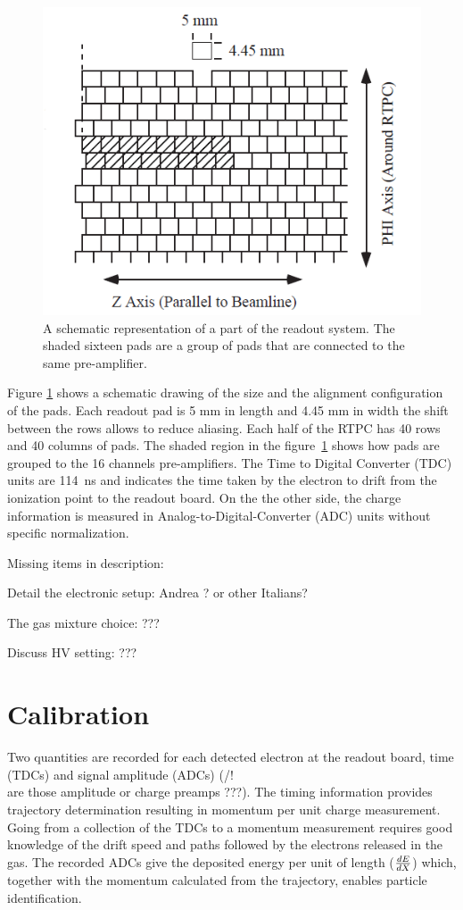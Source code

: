 \documentclass[twocolumn,showpacs,superscriptaddress,groupedaddress]{revtex4}
\begin{document}
\begin{figure}[tb]
   \centering
   \includegraphics[scale=0.55]{fig/PADs.png}
   \caption[]{A schematic representation of a part of the readout system.  The 
   shaded sixteen pads are a group of pads that are connected to the same 
pre-amplifier.} \label{fig:PADs}
\end{figure}

Figure \ref{fig:PADs} shows a schematic drawing of the size and the alignment 
configuration of the pads. Each readout pad is 5 mm in length and 4.45 mm in 
width the shift between the rows allows to reduce aliasing. Each half of the 
RTPC has 40 rows and 40 columns of pads. The shaded region in the 
figure~\ref{fig:PADs} shows how pads are grouped to the 16 channels 
pre-amplifiers. The Time to Digital Converter (TDC) units are 114~ns and 
indicates the time taken by the electron to drift from the ionization point to 
the readout board. On the the other side, the charge information is measured in 
Analog-to-Digital-Converter (ADC) units without specific normalization. 

Missing items in description:

Detail the electronic setup: Andrea ? or other Italians?

The gas mixture choice: ???

Discuss HV setting: ???

\section{Calibration} \label{sec_calib}
Two quantities are recorded for each detected electron at the readout board, 
time (TDCs) and signal amplitude (ADCs) (/!\\ are those amplitude or charge 
preamps ???). The timing information provides trajectory determination 
resulting in momentum per unit charge measurement. Going from a collection of 
the TDCs to a momentum measurement requires good knowledge of the drift speed 
and paths followed by the electrons released in the gas. The recorded ADCs give 
the deposited energy per unit of length ($\small{\frac{dE}{dX}}$) which, 
together with the momentum calculated from the trajectory, enables particle 
identification.
\end{document}
